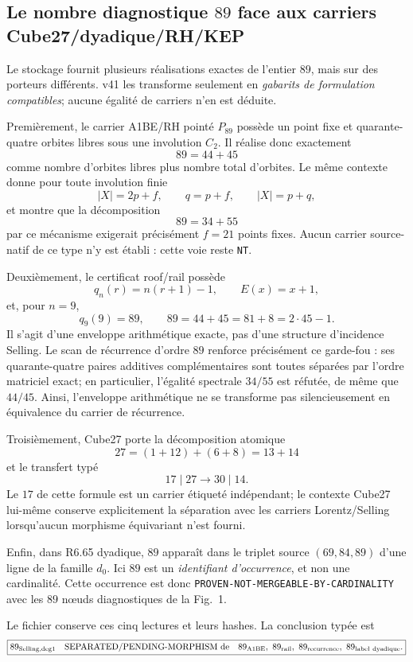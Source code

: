 \documentclass[11pt,a4paper]{article}
\newcommand{\certNT}{\texttt{NT}}
\begin{document}
\subsection{Le nombre diagnostique $89$ face aux carriers Cube27/dyadique/RH/KEP}

Le stockage fournit plusieurs réalisations exactes de l'entier $89$, mais sur des porteurs différents. v41 les transforme seulement en \emph{gabarits de formulation compatibles}; aucune égalité de carriers n'en est déduite.

Premièrement, le carrier A1BE/RH pointé $P_{89}$ possède un point fixe et quarante-quatre orbites libres sous une involution $C_2$. Il réalise donc exactement
\[
 \boxed{89=44+45}
\]
comme nombre d'orbites libres plus nombre total d'orbites. Le même contexte donne pour toute involution finie
\[
 |X|=2p+f,\qquad q=p+f,\qquad |X|=p+q,
\]
et montre que la décomposition
\[
 \boxed{89=34+55}
\]
par ce mécanisme exigerait précisément $f=21$ points fixes. Aucun carrier source-natif de ce type n'y est établi : cette voie reste \certNT.

Deuxièmement, le certificat roof/rail possède
\[
 q_n(r)=n(r+1)-1,
 \qquad E(x)=x+1,
\]
et, pour $n=9$,
\[
 \boxed{q_9(9)=89,
 \qquad89=44+45=81+8=2\cdot45-1.}
\]
Il s'agit d'une enveloppe arithmétique exacte, pas d'une structure d'incidence Selling. Le scan de récurrence d'ordre $89$ renforce précisément ce garde-fou : ses quarante-quatre paires additives complémentaires sont toutes séparées par l'ordre matriciel exact; en particulier, l'égalité spectrale $34/55$ est réfutée, de même que $44/45$. Ainsi, l'enveloppe arithmétique ne se transforme pas silencieusement en équivalence du carrier de récurrence.

Troisièmement, Cube27 porte la décomposition atomique
\[
 27=(1+12)+(6+8)=13+14
\]
et le transfert typé
\[
 \boxed{17\mid27\longrightarrow30\mid14.}
\]
Le $17$ de cette formule est un carrier étiqueté indépendant; le contexte Cube27 lui-même conserve explicitement la séparation avec les carriers Lorentz/Selling lorsqu'aucun morphisme équivariant n'est fourni.

Enfin, dans R6.65 dyadique, $89$ apparaît dans le triplet source $(69,84,89)$ d'une ligne de la famille $d_0$. Ici $89$ est un \emph{identifiant d'occurrence}, et non une cardinalité. Cette occurrence est donc \texttt{PROVEN-NOT-MERGEABLE-BY-CARDINALITY} avec les $89$ nœuds diagnostiques de la Fig.~1.

Le fichier  conserve ces cinq lectures et leurs hashes. La conclusion typée est
\[
 \boxed{
 89_{\rm Selling,deg1}
 \quad\text{SEPARATED/PENDING-MORPHISM de}\quad
 89_{\rm A1BE},\ 89_{\rm rail},\ 89_{\rm recurrence},\ 89_{\rm label\ dyadique}.}
\]
\end{document}
